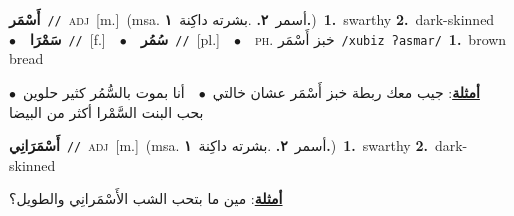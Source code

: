 \documentclass[10pt,a4paper,twoside]{article} %
\begin{document}
\begin{multicols}{2}
{\setlength\topsep{0pt}\textbf{\foreignlanguage{arabic}{أَسْمَر}}\ {\color{gray}\texttt{//}\color{black}}\ \textsc{adj}\ [m.]\ \color{gray}(msa. \foreignlanguage{arabic}{أسمر}~\foreignlanguage{arabic}{\textbf{٢.}}  .\foreignlanguage{arabic}{بشرته داكِنة}~\foreignlanguage{arabic}{\textbf{١.}})\color{black}\ \textbf{1.}~swarthy  \textbf{2.}~dark-skinned\ \ $\bullet$\ \ \setlength\topsep{0pt}\textbf{\foreignlanguage{arabic}{سَمْرَا}}\ {\color{gray}\texttt{//}\color{black}}\ [f.]\ \ $\bullet$\ \ \setlength\topsep{0pt}\textbf{\foreignlanguage{arabic}{سُمُر}}\ {\color{gray}\texttt{//}\color{black}}\ [pl.]\ \ $\bullet$\ \ \textsc{ph.} \color{gray} \foreignlanguage{arabic}{خبز أَسْمَر}\color{black}\ {\color{gray}\texttt{/{\sffamily xubiz ʔasmar}/}\color{black}}\ \textbf{1.}~brown bread\  \begin{flushright}\color{gray}\foreignlanguage{arabic}{\textbf{\underline{\foreignlanguage{arabic}{أمثلة}}}: جيب معك ربطة خبز أَسْمَر عشان خالتي\ $\bullet$\ \  أنا بموت بالسُّمُر كثير حلوين\ $\bullet$\ \  بحب البنت السَّمْرا أكثر من البيضا}\end{flushright}\color{black}} \vspace{2mm}

{\setlength\topsep{0pt}\textbf{\foreignlanguage{arabic}{أَسْمَرَانِي}}\ {\color{gray}\texttt{//}\color{black}}\ \textsc{adj}\ [m.]\ \color{gray}(msa. \foreignlanguage{arabic}{أسمر}~\foreignlanguage{arabic}{\textbf{٢.}}  .\foreignlanguage{arabic}{بشرته داكِنة}~\foreignlanguage{arabic}{\textbf{١.}})\color{black}\ \textbf{1.}~swarthy  \textbf{2.}~dark-skinned\  \begin{flushright}\color{gray}\foreignlanguage{arabic}{\textbf{\underline{\foreignlanguage{arabic}{أمثلة}}}: مين ما بتحب الشب الأَسْمَرانِي والطويل؟}\end{flushright}\color{black}} \vspace{2mm}


\end{multicols}
\end{document}

